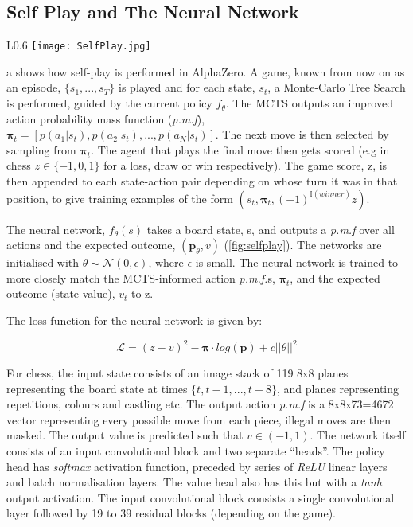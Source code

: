 \documentclass[../main.tex]{subfiles}
\begin{document}
\subsection{Self Play and The Neural Network}

\begin{wrapfigure}{L}{0.6\textwidth}
   \centering
   \texttt{[image: SelfPlay.jpg]}
   \caption{A schematic showing how self-play and policy training are performed. Taken from \cite{AlphaGoZero}.}
   \label{fig:selfplay}
   \vspace{0.5cm}
\end{wrapfigure}

a
shows how self-play is performed in AlphaZero. A game, known from now on as an episode, $\{s_1, ..., s_T\}$ is played and for each state, $s_t$, a Monte-Carlo Tree Search is performed, guided by the current policy $f_\theta$. The MCTS outputs an improved action probability mass function (\textit{p.m.f}), $\boldsymbol{\pi}_t = [p(a_1|s_t), p(a_2|s_t), ..., p(a_N|s_t)]$. The next move is then selected by sampling from $\boldsymbol{\pi}_t$. The agent that plays the final move then gets scored (e.g in chess $z \in \{-1, 0, 1\} $ for a loss, draw or win respectively). The game score, z, is then appended to each state-action pair depending on whose turn it was in that position, to give training examples of the form $(s_t, \boldsymbol{\pi}_t, (-1)^{\mathbb{I}(winner)}z)$. 

The neural network, $f_\theta(s)$ takes a board state, s, and outputs a \textit{p.m.f} over all actions and the expected outcome, $(\boldsymbol{p}_\theta, v)$ (\cref{fig:selfplay}). The networks are initialised with $\theta \sim \mathcal{N}(0, \epsilon)$, where $\epsilon$ is small. The neural network is trained to more closely match the MCTS-informed action \textit{p.m.f.}s, $\boldsymbol{\pi}_t$, and the expected outcome (state-value), $v_t$ to z.

The loss function for the neural network is given by:

\begin{equation}
    \mathcal{L} = (z - v)^2 - \boldsymbol{\pi} \cdot log(\boldsymbol{p}) + c||\theta||^2
   \label{eqn:loss}
\end{equation}

For chess, the input state consists of an image stack of 119 8x8 planes representing the board state at times $ \{ t, t-1, ..., t-8 \} $, and planes representing repetitions, colours and castling etc. The output action \textit{p.m.f} is a 8x8x73=4672 vector representing every possible move from each piece, illegal moves are then masked. The output value is predicted such that $v \in (-1, 1)$. 
The network itself consists of an input convolutional block and two separate ``heads''. The policy head has \textit{softmax} activation function, preceded by series of \textit{ReLU} linear layers and batch normalisation layers. The value head also has this but with a \textit{tanh} output activation. The input convolutional block consists a single convolutional layer followed by 19 to 39 residual blocks (depending on the game).
\end{document}
